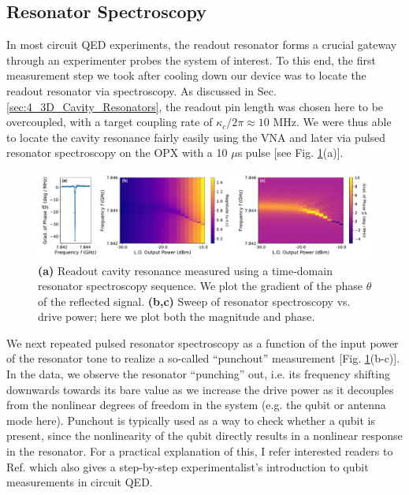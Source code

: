 \subsection{Resonator Spectroscopy}
In most circuit QED experiments, the readout resonator forms a crucial gateway through an experimenter probes the system of interest. To this end, the first measurement step we took after cooling down our device was to locate the readout resonator via spectroscopy. As discussed in Sec. \ref{sec:4_3D_Cavity_Resonators}, the readout pin length was chosen here to be overcoupled, with a target coupling rate of $\kappa_c/2\pi \approx 10$ MHz. We were thus able to locate the cavity resonance fairly easily using the VNA and later via pulsed resonator spectroscopy on the OPX with a 10 $\mu$s pulse [see Fig. \ref{fig:4_resonator_spectroscopy}(a)].
\begin{figure}[h]
    \centering
    \includegraphics[width=\linewidth]{Figures/4/resonator_spectroscopy.pdf}
    \caption{\textbf{(a)} Readout cavity resonance measured using a time-domain resonator spectroscopy sequence. We plot the gradient of the phase $\theta$ of the reflected signal. \textbf{(b,c)} Sweep of resonator spectroscopy vs. drive power; here we plot both the magnitude and phase.}
    \label{fig:4_resonator_spectroscopy}
\end{figure}

We next repeated pulsed resonator spectroscopy as a function of the input power of the resonator tone to realize a so-called ``punchout'' measurement [Fig. \ref{fig:4_resonator_spectroscopy}(b-c)]. In the data, we observe the resonator ``punching'' out, i.e. its frequency shifting downwards towards its bare value as we increase the drive power as it decouples from the nonlinear degrees of freedom in the system (e.g. the qubit or antenna mode here). Punchout is typically used as a way to check whether a qubit is present, since the nonlinearity of the qubit directly results in a nonlinear response in the resonator. For a practical explanation of this, I refer interested readers to Ref. \cite{naghiloo2019introduction} which also gives a step-by-step experimentalist's introduction to qubit measurements in circuit QED. 

